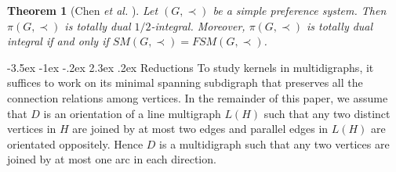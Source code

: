 \documentclass[11pt]{article}
\makeatletter
\newtheorem{theorem}{Theorem}%
\numberwithin{theorem}{section}
\renewcommand\section{%
  \@startsection{section}{1}
                {\z@}%
                {-3.5ex \@plus -1ex \@minus -.2ex}%
                {2.3ex \@plus.2ex}%
                {\large\bfseries}%
}
\makeatother
\begin{document}
\begin{theorem}[Chen \textit{et al.} \cite{ChenDing12}]
\label{thm:ChenDing12}
Let $(G,\prec)$ be a simple preference system. Then $\pi(G,\prec)$ is totally dual $1/2$-integral. Moreover, $\pi(G,\prec)$ is totally dual integral if and only if $SM(G,\prec)=FSM(G,\prec)$.
\end{theorem}

\section{Reductions}
To study kernels in multidigraphs, it suffices to work on its minimal spanning subdigraph that  preserves all the connection relations among vertices. In the remainder of this paper, we assume that $D$ is an orientation of a line multigraph $L(H)$ such that any two distinct vertices in $H$ are joined by at most two edges and parallel edges in $L(H)$ are orientated oppositely. Hence $D$ is a multidigraph such that any two vertices are joined by at most one arc in each direction.
\end{document}
